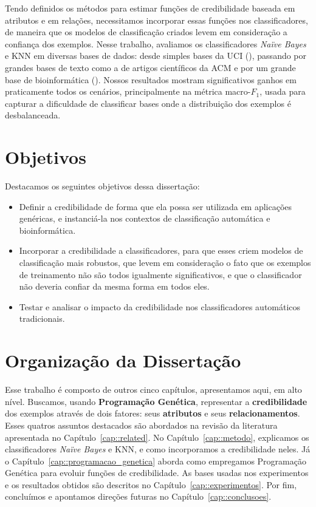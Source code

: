 Tendo definidos os métodos para estimar funções de credibilidade baseada em atributos e em relações, necessitamos incorporar essas funções nos classificadores, de maneira que os modelos de classificação criados levem em consideração a confiança dos exemplos. Nesse trabalho, avaliamos os classificadores \textit{Naïve Bayes} e \textsc{KNN} em diversas bases de dados: desde simples bases da \textsc{UCI} (\cite{UCI98}), passando por grandes bases de texto como a de artigos científicos da \textsc{ACM} e por um grande base de bioinformática (\cite{dpires_bmc_2011}).
Nossos resultados mostram significativos ganhos em praticamente todos os cenários, principalmente na métrica macro-$F_1$, usada para capturar a dificuldade de classificar bases onde a distribuição dos exemplos é desbalanceada.


\section{Objetivos}

Destacamos os seguintes objetivos dessa dissertação:

\begin{itemize}
 
\item Definir a credibilidade de forma que ela possa ser utilizada em aplicações genéricas, e instanciá-la nos contextos de classificação automática e bioinformática.
\item Incorporar a credibilidade a classificadores, para que esses criem modelos de classificação mais robustos, que levem em consideração o fato que os exemplos de treinamento não são todos igualmente significativos, e que o classificador não deveria confiar da mesma forma em todos eles. 
\item Testar e analisar o impacto da credibilidade nos classificadores automáticos tradicionais.

\end{itemize}

\section{Organização da Dissertação}

Esse trabalho é composto de outros cinco capítulos, apresentamos aqui, em alto nível.
Buscamos, usando \textbf{Programação Genética}, representar a \textbf{credibilidade} dos exemplos através de dois fatores: seus \textbf{atributos} e seus \textbf{relacionamentos}.
Esses quatros assuntos destacados são abordados na revisão da literatura apresentada no Capítulo~\ref{cap::related}.
No Capítulo~\ref{cap::metodo}, explicamos os classificadores \textit{Naïve Bayes} e \textsc{KNN}, e como incorporamos a credibilidade neles.
Já o Capítulo~\ref{cap::programacao_genetica} aborda como empregamos Programação Genética para evoluir funções de credibilidade.
As bases usadas nos experimentos e os resultados obtidos são descritos no Capítulo~\ref{cap::experimentos}. Por fim, concluímos e apontamos direções futuras no Capítulo~\ref{cap::conclusoes}.


